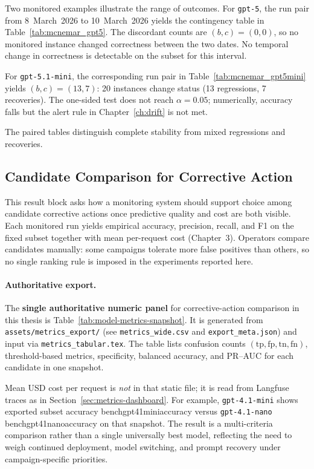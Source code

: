 Two monitored examples illustrate the range of outcomes. For \texttt{gpt-5}, the run pair from 8~March~2026 to 10~March~2026 yields the contingency table in Table~\ref{tab:mcnemar_gpt5}. The discordant counts are \((b,c)=(0,0)\), so no monitored instance changed correctness between the two dates. No temporal change in correctness is detectable on the subset for this interval.

For \texttt{gpt-5.1-mini}, the corresponding run pair in Table~\ref{tab:mcnemar_gpt5mini} yields \((b,c)=(13,7)\): 20 instances change status (13 regressions, 7 recoveries). The one-sided test does not reach \(\alpha=0.05\); numerically, accuracy falls but the alert rule in Chapter~\ref{ch:drift} is not met.

The paired tables distinguish complete stability from mixed regressions and recoveries.

\subsection{Candidate Comparison for Corrective Action}
\label{sec:cost-aware-comparison}

This result block asks how a monitoring system should support choice among candidate corrective actions once predictive quality and cost are both visible. Each monitored run yields empirical accuracy, precision, recall, and F1 on the fixed subset together with mean per-request cost (Chapter~3). Operators compare candidates manually: some campaigns tolerate more false positives than others, so no single ranking rule is imposed in the experiments reported here.

\paragraph{Authoritative export.}
The \textbf{single authoritative numeric panel} for corrective-action comparison in this thesis is Table~\ref{tab:model-metrics-snapshot}. It is generated from \texttt{assets/metrics\_export/} (see \texttt{metrics\_wide.csv} and \texttt{export\_meta.json}) and input via \texttt{metrics\_tabular.tex}. The table lists confusion counts $(\mathrm{tp},\mathrm{fp},\mathrm{tn},\mathrm{fn})$, threshold-based metrics, specificity, balanced accuracy, and PR--AUC for each candidate in one snapshot.

Mean USD cost per request is \emph{not} in that static file; it is read from Langfuse traces as in Section~\ref{sec:metrics-dashboard}. For example, \texttt{gpt-4.1-mini} shows exported subset accuracy {\csname benchgpt41miniaccuracy\endcsname} versus \texttt{gpt-4.1-nano} {\csname benchgpt41nanoaccuracy\endcsname} on that snapshot. The result is a multi-criteria comparison rather than a single universally best model, reflecting the need to weigh continued deployment, model switching, and prompt recovery under campaign-specific priorities.

